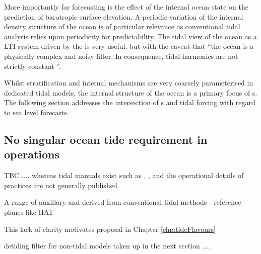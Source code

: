 More importantly for forecasting is the effect of the internal ocean state on the prediction of barotropic surface elevation.  A-periodic variation of the internal density structure of the ocean is of particular relevance as   conventional tidal analysis relies upon periodicity for predictability.     The tidal view of the ocean as a LTI system driven by the \ATGP{} is very useful, but with the caveat that ``the ocean is a physically complex and noisy filter.  In consequence, tidal harmonics are not strictly constant \citep[197]{Ray:2010jm}''.


Whilst stratification and internal mechanisms are very coarsely parameterised in dedicated tidal models, the internal structure of the ocean is a primary focus of \OGCM{}s.   The following section addresses the intersection of \OGCM{}s and tidal forcing with regard to sea level forecasts.


\subsection{No singular ocean tide requirement in operations}

TBC .... 
whereas tidal manuals exist such as \citep{PCTMSL-sp9}, \citep{IOC:2005tj}, \citep{Level:2011wu}and \citep{Parker:2007wq} the operational details of practices are not generally published. 



A range of auxillary and derived from conventional tidal methods
- reference planes like HAT
- 



This lack of clarity motivates proposal in Chapter \ref{chp:tideFlavours}



detiding filter for non-tidal models taken up in the next section ....